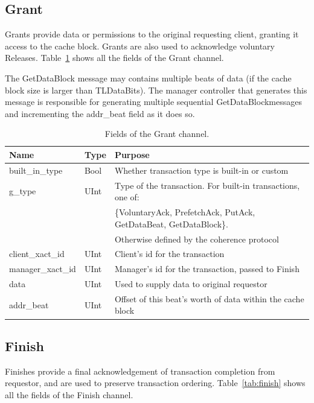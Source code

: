 \subsection{Grant}

Grants provide data or permissions to the original requesting client, granting it access to the cache block.
Grants are also used to acknowledge voluntary Releases.
Table~\ref{tab:grant} shows all the fields of the Grant channel.

The GetDataBlock message may contains multiple beats of data (if the cache block size is larger than TLDataBits).
The manager controller that generates this message is responsible for generating multiple sequential GetDataBlockmessages and incrementing the addr\_beat field as it does so.

\begin{table}[ht]
\begin{center}
\begin{tabular}{|l|l|l|}
    \hline
    Name & Type & Purpose \\ \hline \hline
built\_in\_type & Bool & Whether transaction type is built-in or custom \\ \hline
g\_type & UInt & Type of the transaction. For built-in transactions, one of: \\
        &      & \{VoluntaryAck, PrefetchAck, PutAck, GetDataBeat, GetDataBlock\}. \\
        &      & Otherwise defined by the coherence protocol \\ \hline
client\_xact\_id & UInt & Client's id for the transaction \\ \hline
manager\_xact\_id & UInt & Manager's id for the transaction, passed to Finish \\ \hline
data & UInt & Used to supply data to original requestor \\ \hline
addr\_beat & UInt & Offset of this beat's worth of data within the cache block \\ \hline
\end{tabular}
\end{center}
\caption{Fields of the Grant channel.}
\label{tab:grant}
\end{table}


\subsection{Finish}

Finishes provide a final acknowledgement of transaction completion from requestor, and are used to preserve transaction ordering.
Table~\ref{tab:finish} shows all the fields of the Finish channel.

